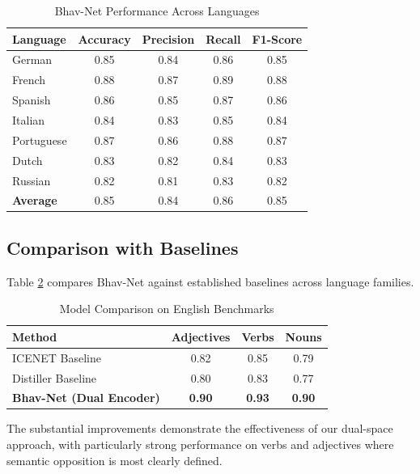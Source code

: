 \documentclass[11pt]{article}
\begin{document}
\begin{table}[htbp]
\caption{Bhav-Net Performance Across Languages}
\begin{center}
\begin{tabular}{|l|c|c|c|c|}
\hline
\textbf{Language} & \textbf{Accuracy} & \textbf{Precision} & \textbf{Recall} & \textbf{F1-Score} \\
\hline
German & 0.85 & 0.84 & 0.86 & 0.85 \\
\hline
French & 0.88 & 0.87 & 0.89 & 0.88 \\
\hline
Spanish & 0.86 & 0.85 & 0.87 & 0.86 \\
\hline
Italian & 0.84 & 0.83 & 0.85 & 0.84 \\
\hline
Portuguese & 0.87 & 0.86 & 0.88 & 0.87 \\
\hline
Dutch & 0.83 & 0.82 & 0.84 & 0.83 \\
\hline
Russian & 0.82 & 0.81 & 0.83 & 0.82 \\
\hline
\hline
\textbf{Average} & 0.85 & 0.84 & 0.86 & 0.85 \\
\hline
\end{tabular}
\label{tab:results}
\end{center}
\end{table}

\subsection{Comparison with Baselines}
Table \ref{tab:comparison} compares Bhav-Net against established baselines across language families.

\begin{table}[htbp]
\caption{Model Comparison on English Benchmarks}
\begin{center}
\begin{tabular}{|l|c|c|c|}
\hline
\textbf{Method} & \textbf{Adjectives} & \textbf{Verbs} & \textbf{Nouns} \\
\hline
ICENET Baseline & 0.82 & 0.85 & 0.79 \\
\hline
Distiller Baseline & 0.80 & 0.83 & 0.77 \\
\hline
\textbf{Bhav-Net (Dual Encoder)} & \textbf{0.90} & \textbf{0.93} & \textbf{0.90} \\
\hline
\end{tabular}
\label{tab:comparison}
\end{center}
\end{table}

The substantial improvements demonstrate the effectiveness of our dual-space approach, with particularly strong performance on verbs and adjectives where semantic opposition is most clearly defined.
\end{document}
